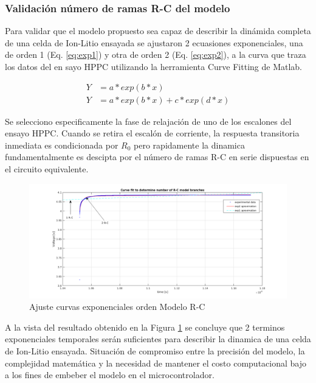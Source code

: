 \documentclass[10pt,a4paper]{article}
\begin{document}
\subsubsection{Validación número de ramas R-C del modelo}

Para validar que el modelo propuesto sea capaz de describir la dinámida completa
de una celda de Ion-Litio ensayada se ajustaron 2 ecuasiones exponenciales, una
de orden 1 (Eq. \ref{eq:exp1}) y otra de orden 2 (Eq. \ref{eq:exp2}), a la curva
que traza los datos del en sayo HPPC utilizando la herramienta Curve Fitting de
Matlab.

\begin{align}
    Y &= a*exp(b*x)\label{eq:exp1}\\
    Y &= a*exp(b*x)+c*exp(d*x)\label{eq:exp2}
\end{align}

Se selecciono especificamente la fase de relajación de uno de los escalones del
ensayo HPPC. Cuando se retira el escalón de corriente, la respuesta transitoria
inmediata es condicionada por $R_{0}$ pero rapidamente la dinamica
fundamentalmente es descipta por el número de ramas R-C en serie dispuestas en
el circuito equivalente. 

\begin{figure}[h!]
    \begin{center}
        \includegraphics[width=.9\textwidth]{rc_model_fit.png}
        \caption{Ajuste curvas exponenciales orden Modelo R-C}
        \label{fig:model_fit}
    \end{center}
\end{figure}
\FloatBarrier

A la vista del resultado obtenido en la Figura \ref{fig:model_fit} se concluye
que 2 terminos exponenciales temporales serán suficientes para describir la
dinamica de una celda de Ion-Litio ensayada. Situación de compromiso entre
la precisión del modelo, la complejidad matemática y la necesidad de mantener el
costo computacional bajo a los fines de embeber el modelo en el
microcontrolador. 
\end{document}
